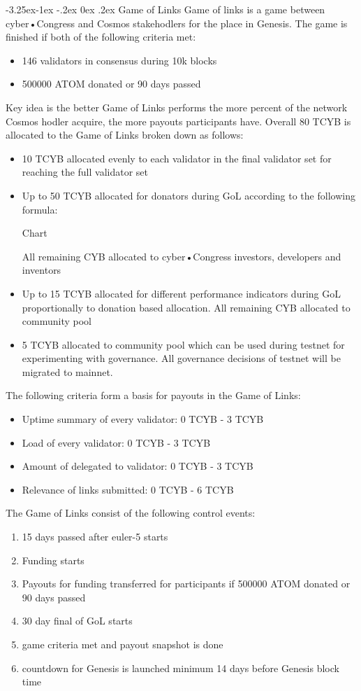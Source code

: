 \documentclass[8pt,oneside]{amsart}
\makeatletter
\renewcommand\subsection{\@startsection{subsection}{2}{\z@}%
                                     {-3.25ex\@plus -1ex \@minus -.2ex}%
                                     {0ex \@plus .2ex}%
                                     {\play\Large}}%
\newcommand{\titleSection}[1]{\subsection{#1}}
\makeatother
\begin{document}
\titleSection{Game of Links}\label{gol}
Game of links is a game between cyber•Congress and Cosmos stakehodlers for the place in Genesis. The game is finished if both of the following criteria met:
\begin{itemize} 
\item 146 validators in consensus during 10k blocks
\item 500000 ATOM donated or 90 days passed
\end{itemize} 

Key idea is the better Game of Links performs the more percent of the network Cosmos hodler acquire, the more payouts participants have. Overall 80 TCYB is allocated to the Game of Links broken down as follows:

\begin{itemize} 
\item 10 TCYB allocated evenly to each validator in the final validator set for reaching the full validator set
\item Up to 50 TCYB allocated for donators during GoL according to the following formula:

Chart

All remaining CYB allocated to cyber•Congress investors, developers and inventors
\item Up to 15 TCYB allocated for different performance indicators during GoL proportionally to donation based allocation. All remaining CYB allocated to community pool
\item 5 TCYB allocated to community pool which can be used during testnet for experimenting with governance. All governance decisions of testnet will be migrated to mainnet.
\end{itemize}

The following criteria form a basis for payouts in the Game of Links:
\begin{itemize} 
\item Uptime summary of every validator: 0 TCYB - 3 TCYB
\item Load of every validator: 0 TCYB - 3 TCYB
\item Amount of delegated to validator: 0 TCYB - 3 TCYB
\item Relevance of links submitted: 0 TCYB - 6 TCYB
\end{itemize}

The Game of Links consist of the following control events:
\begin{enumerate}
\item 15 days passed after euler-5 starts
\item Funding starts
\item Payouts for funding transferred for participants if 500000 ATOM donated or 90 days passed
\item 30 day final of GoL starts
\item game criteria met and payout snapshot is done 
\item countdown for Genesis is launched minimum 14 days before Genesis block time
\end{enumerate}
\end{document}
